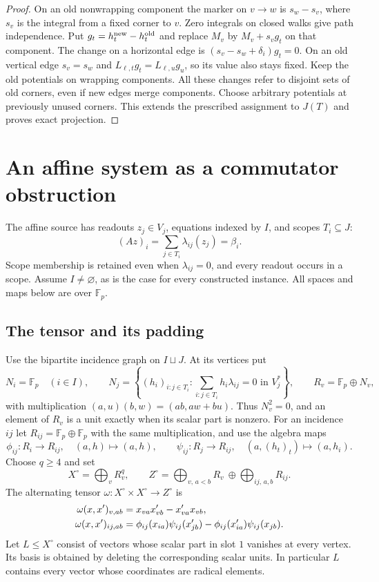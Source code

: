 \documentclass[11pt]{article}
\newcommand{\F}{\mathbb F_p}
\theoremstyle{definition}
\theoremstyle{remark}
\numberwithin{equation}{section}
\begin{document}
\begin{proof}
On an old nonwrapping component the marker on $v\to w$ is $s_w-s_v$,
where $s_v$ is the integral from a fixed corner to $v$. Zero integrals
on closed walks give path independence. Put
$g_t=h_t^{\rm new}-h_t^{\rm old}$ and replace
$M_v$ by $M_v+s_vg_t$ on that component. The change on a horizontal
edge is $(s_v-s_w+\delta_i)g_t=0$. On an old vertical edge $s_v=s_w$
and $L_{\ell,t}g_t=L_{\ell,u}g_u$, so its value also stays fixed.
Keep the old potentials on wrapping components. All these changes refer
to disjoint sets of old corners, even if new edges merge components.
Choose arbitrary potentials at previously unused corners. This extends
the prescribed assignment to $J(T)$ and proves exact projection.
\end{proof}


\section{An affine system as a commutator obstruction}
\label{hyb:algebra}

The affine source has readouts $z_j\in V_j$, equations indexed by $I$,
and scopes $T_i\subseteq J$:
\begin{equation}
 (Az)_i=\sum_{j\in T_i}\lambda_{ij}(z_j)=\beta_i.
 \label{hyb:source-equations}
\end{equation}
Scope membership is retained even when $\lambda_{ij}=0$, and every
readout occurs in a scope.  Assume $I\ne\varnothing$, as is the case for every constructed instance.  All spaces and maps below are over $\F$.

\subsection{The tensor and its padding}

Use the bipartite incidence graph on $I\sqcup J$.  At its vertices put
\[
 N_i=\F\quad(i\in I),\qquad
 N_j=\left\{(h_i)_{i:j\in T_i}:
                 \sum_{i:j\in T_i}h_i\lambda_{ij}=0\text{ in }V_j^*\right\},
 \qquad R_v=\F\oplus N_v,
\]
with multiplication $(a,u)(b,w)=(ab,aw+bu)$.  Thus $N_v^2=0$, and an
element of $R_v$ is a unit exactly when its scalar part is nonzero.
For an incidence $ij$ let $R_{ij}=\F\oplus\F$ with the same
multiplication, and use the algebra maps
\[
 \phi_{ij}:R_i\to R_{ij},\quad(a,h)\mapsto(a,h),\qquad
 \psi_{ij}:R_j\to R_{ij},\quad(a,(h_t)_t)\mapsto(a,h_i).
\]
Choose $q\ge4$ and set
\[
 X^\circ=\bigoplus_v R_v^q,\qquad
 Z^\circ=\bigoplus_{v,\,a<b}R_v\ \oplus\bigoplus_{ij,\,a,b}R_{ij}.
\]
The alternating tensor $\omega:X^\circ\times X^\circ\to Z^\circ$ is
\begin{align}
 \omega(x,x')_{v,ab}&=x_{va}x'_{vb}-x'_{va}x_{vb},\notag\\
 \omega(x,x')_{ij,ab}
   &=\phi_{ij}(x_{ia})\psi_{ij}(x'_{jb})
       -\phi_{ij}(x'_{ia})\psi_{ij}(x_{jb}).
 \label{hyb:omega}
\end{align}
Let $L\le X^\circ$ consist of vectors whose scalar part in slot $1$
vanishes at every vertex. Its basis is obtained by deleting the
corresponding scalar units. In particular $L$ contains every vector
whose coordinates are radical elements.
\end{document}
